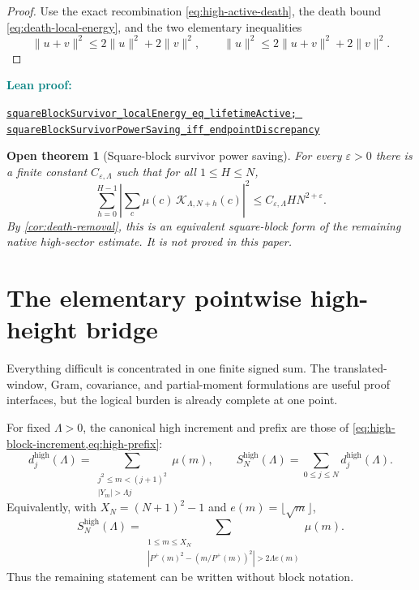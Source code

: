 \documentclass[11pt]{article}
\newtheorem{conjecture}[theorem]{Open theorem}
\theoremstyle{definition}
\newcommand{\eps}{\varepsilon}
\newcommand{\Pplus}{P^{+}}
\newcommand{\1}{\mathbf{1}}
\newcommand{\leanxref}[3]{%
  \par\smallskip
  {\small\noindent\textcolor{teal}{\textbf{#1:}}\par
  \noindent\href{#3}{\nolinkurl{#2}}\par}
  \smallskip
}
\begin{document}
\begin{proof}
Use the exact recombination \cref{eq:high-active-death}, the death bound \cref{eq:death-local-energy}, and the two elementary inequalities
\[
 \|u+v\|^2\le2\|u\|^2+2\|v\|^2,
 \qquad
 \|u\|^2\le2\|u+v\|^2+2\|v\|^2.
\]
\end{proof}
\leanxref{Lean proof}{squareBlockSurvivor_localEnergy_eq_lifetimeActive; squareBlockSurvivorPowerSaving_iff_endpointDiscrepancy}{https://github.com/OVVO-Financial/square-block-mobius/blob/main/lean/RHLean/Analysis/SquareBlockSurvivorBridge.lean}

\begin{conjecture}[Square-block survivor power saving]
\label{conj:survivor-power-saving}
For every $\eps>0$ there is a finite constant $C_{\eps,\Lambda}$ such that for all $1\le H\le N$,
\begin{equation}
 \boxed{
 \sum_{h=0}^{H-1}
 \left|
 \sum_{c}\mu(c)\,\mathcal K_{\Lambda,N+h}(c)
 \right|^2
 \le C_{\eps,\Lambda}H N^{2+\eps}.
 }
 \label{eq:survivor-power-saving}
\end{equation}
By \cref{cor:death-removal}, this is an equivalent square-block form of the remaining native high-sector estimate.  It is not proved in this paper.
\end{conjecture}


\section{The elementary pointwise high-height bridge}
\label{sec:high-sector}

Everything difficult is concentrated in one finite signed sum.  The translated-window, Gram, covariance, and partial-moment formulations are useful proof interfaces, but the logical burden is already complete at one point.

For fixed $\Lambda>0$, the canonical high increment and prefix are those of \cref{eq:high-block-increment,eq:high-prefix}:
\[
 d_j^{\mathrm{high}}(\Lambda)
 =
 \sum_{\substack{j^2\le m<(j+1)^2\\|Y_m|>\Lambda j}}\mu(m),
 \qquad
 S_N^{\mathrm{high}}(\Lambda)
 =\sum_{0\le j\le N}d_j^{\mathrm{high}}(\Lambda).
\]
Equivalently, with $X_N=(N+1)^2-1$ and $e(m)=\lfloor\sqrt m\rfloor$,
\begin{equation}
 \boxed{
 S_N^{\mathrm{high}}(\Lambda)
 =
 \sum_{\substack{1\le m\le X_N\\
 |\Pplus(m)^2-(m/\Pplus(m))^2|>2\Lambda e(m)}}\mu(m).
 }
 \label{eq:high-single-finite-sum}
\end{equation}
Thus the remaining statement can be written without block notation.
\end{document}
